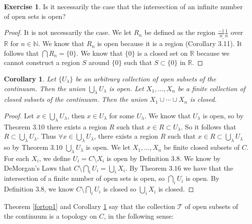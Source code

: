 \documentclass[12pt]{article}
\renewcommand{\_}[1]{\underline{ #1 }}
\newtheorem{corollary}[theorem]{Corollary}
\theoremstyle{definition}
\newtheorem{exercise}[theorem]{Exercise}
\numberwithin{equation}{subsection}
\begin{document}
\begin{exercise}  Is it necessarily the case that the intersection of an infinite number of open sets is open?
\end{exercise}
 
\begin{proof}
It is not necessarily the case. We let $R_n$ be defined as the region $\underline{\frac{-1}{n} \frac{1}{n}}$ over $\mathbb R$ for $n \in \mathbb N$. We know that $R_n$ is open because it is a region (Corollary 3.11). It follows that $\bigcap R_n = \{0\}$. We know that $\{0\}$ is a closed set on $\mathbb R$ because we cannot construct a region $S$ around $\{0\}$ such that $S \subset \{0\}$ in $\mathbb R$. 
\end{proof}

\begin{corollary}\label{fortop2}  Let $\{U_{\lambda} \}$ be an arbitrary collection of open subsets of the continuum.  Then the union $\bigcup_{\lambda} U_{\lambda}$ is open.  Let $X_1, \dotsc, X_n$ be a finite collection of closed subsets of the continuum.  Then the union $X_1 \cup \dotsm \cup X_n$ is closed.
\end{corollary}

\begin{proof}
Let $x \in \bigcup_{\lambda} U_{\lambda}$, then $x \in U_{\lambda}$ for some $U_{\lambda}$. We know that $U_{\lambda}$ is open, so by Theorem 3.10 there exists a region $R$ such that $x \in R \subset U_{\lambda}$. So it follows that $R \subset \bigcup_{\lambda} U_{\lambda}$. Thus $\forall x \in \bigcup_{\lambda} U_{\lambda}$, there exists a region $R$ such that $x \in R \subset \bigcup_{\lambda} U_{\lambda}$ so by Theorem 3.10 $\bigcup_{\lambda} U_{\lambda}$ is open.
We let $X_1, ..., X_n$ be finite closed subsets of $C$. For each $X_i$, we define $U_i = C \setminus X_i$ is open by Definition 3.8. We know by DeMorgan's Laws that $C \setminus \bigcap_i U_i = \bigcup_i X_i$. By Theorem 3.16 we have that the intersection of a finite number of open sets is open, so $\bigcap_i U_i$ is open. By Definition 3.8, we know $C \setminus \bigcap_i U_i$ is closed so $\bigcup_i X_i$ is closed.
\end{proof}




Theorem \ref{fortop1} and Corollary \ref{fortop2} say that the collection $\mathscr{T}$ of open subsets of the continuum is a topology on $C$, in the following sense:
\end{document}
